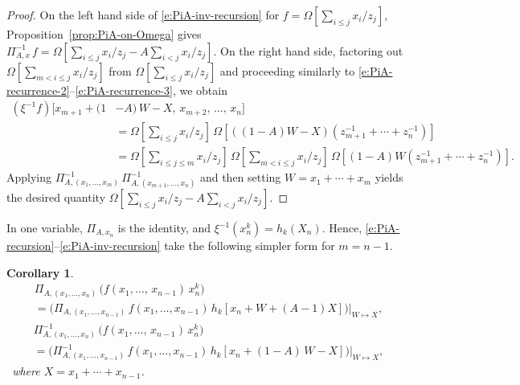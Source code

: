 \documentclass[12pt]{amsart}
\newtheorem{cor}[thm]{Corollary}
\theoremstyle{definition}
\theoremstyle{remark}
\begin{document}
\begin{proof}
On the left hand side of \eqref{e:PiA-inv-recursion} for $f = \Omega
[\sum _{i\leq j} x_{i}/z_{j}]$, Proposition~\ref{prop:PiA-on-Omega}
gives $\Pi _{A,x}^{-1}\, f = \Omega [\sum _{i\leq j} x_{i}/z_{j} - A
\sum _{i<j}x_{i}/z_{j}]$.  On the right hand side, factoring out
$\Omega [\sum _{m< i\leq j} x_{i}/z_{j}]$ from $\Omega [\sum _{i\leq
j} x_{i}/z_{j}]$ and proceeding similarly to
\eqref{e:PiA-recurrence-2}--\eqref{e:PiA-recurrence-3}, we obtain
\begin{equation}\label{e:PiA-inv-recurrence-1}
\begin{aligned}
(\xi ^{-1} f)[x_{m+1} + (1& - A)\, W - X,\, x_{m+2},\, \ldots,\, x_{n}] \\
& = \Omega [\sum _{i\leq j} x_{i}/z_{j}]\, \Omega
[((1-A)W-X)(z_{m+1}^{-1}+\cdots +z_{n}^{-1})]\\
& = \Omega [\sum _{i\leq j\leq m} x_{i}/z_{j}]\,\Omega [\sum _{m<i\leq
j} x_{i}/z_{j}]\,\Omega [(1-A) W (z_{m+1}^{-1}+\cdots +z_{n}^{-1})].
\end{aligned}
\end{equation}
Applying $ \Pi _{A,(x_{1},\ldots,x_{m})}^{-1} \, \Pi
_{A,(x_{m+1},\ldots,x_{n})}^{-1}$ and then setting $W = x_{1}+\cdots
+x_{m}$ yields the desired quantity $\Omega [\sum _{i\leq j}
x_{i}/z_{j} - A \sum _{i<j}x_{i}/z_{j}]$.
\end{proof}

In one variable, $\Pi _{A,x_{n}}$ is the identity, and $\xi
^{-1}(x_{n}^{k})= h_{k}(X_{n})$.  Hence,
\eqref{e:PiA-recursion}--\eqref{e:PiA-inv-recursion} take the
following simpler form for $m = n-1$.

\begin{cor}\label{cor:PiA-recursions}
\begin{multline}\label{e:PiA-recursion-m=n-1}
\Pi_{A,(x_1,\ldots,x_n)} \, \big(f(x_{1},\ldots,\,  x_{n-1})\, x_{n}^{k}\big)\\
 = \bigl( \Pi _{A,(x_{1},\ldots,x_{n-1})}\,
f(x_{1},\ldots,x_{n-1})\,h_{k}[x_{n}+W+(A-1)X] \bigr) \bigr|_{W\mapsto
X},
\end{multline}
\begin{multline}
\label{e:PiA-inv-recursion-m=n-1}
\Pi _{A,(x_1,\ldots,x_n)}^{-1} \, \big(f(x_{1},\ldots,\, x_{n-1})\, x_{n}^{k}\big) \\
 = \bigl( \Pi _{A,(x_{1},\ldots,x_{n-1})}^{-1}\,
f(x_{1},\ldots,x_{n-1})\, h_{k}[x_{n}+(1-A)\, W - X] \bigr)
\bigr|_{W\mapsto X},
\end{multline}\
where $X = x_{1}+\cdots +x_{n-1}$.
\end{cor}
\end{document}
